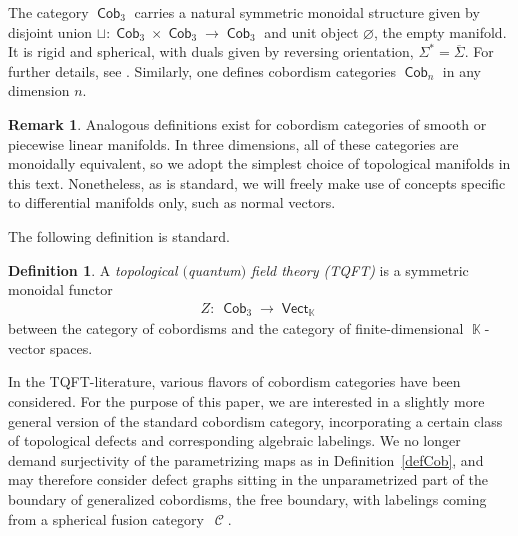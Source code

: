 \documentclass[10pt,a4paper]{amsart}
\DeclareMathOperator{\vect}{\mathsf{Vect}}
\DeclareMathOperator{\K}{\mathbb{K}}
\DeclareMathOperator{\Cob}{\mathsf{Cob}}
\DeclareMathOperator{\calc}{\mathcal{C}}
\numberwithin{equation}{section}
\theoremstyle{definition}
\newtheorem{Definition}[Definition]{Definition}
\newtheorem{Remark}[Remark]{Remark}
\begin{document}
The category $\Cob_3$ carries a natural symmetric monoidal structure given by disjoint union $\sqcup\colon \Cob_3 \times \Cob_3 \rightarrow \Cob_3$ and unit object $\varnothing$, the empty manifold. It is rigid and spherical, with duals given by reversing orientation, $\Sigma^* = \overline{\Sigma}$. For further details, see \cite[Section 10.1]{TV}. Similarly, one defines cobordism categories $\Cob_n$ in any dimension $n$.
\begin{Remark}
 \label{remTopPL}
 Analogous definitions exist for cobordism categories of smooth or piecewise linear manifolds. In three dimensions, all of these categories are monoidally equivalent, so we adopt the simplest choice of topological manifolds in this text. Nonetheless, as is standard, we will freely make use of concepts specific to differential manifolds only, such as normal vectors.
\end{Remark}
The following definition is standard.
\begin{Definition}
 \label{defTQFT}
 A \textit{topological $($quantum$)$ field theory (TQFT)} is a symmetric monoidal functor
 \begin{align*}
 Z\colon \ \Cob_3 \rightarrow \vect_{\K}
 \end{align*}
 between the category of cobordisms and the category of finite-dimensional $\K$-vector spaces.
\end{Definition}
In the TQFT-literature, various flavors of cobordism categories have been considered. For the purpose of this paper, we are interested in a slightly more general version of the standard cobordism category, incorporating a certain class of topological defects and corresponding algebraic labelings. We no longer demand surjectivity of the parametrizing maps as in Definition~\ref{defCob}, and may therefore consider defect graphs sitting in the unparametrized part of the boundary of generalized cobordisms, the free boundary, with labelings coming from a spherical fusion category~$\calc$.
\end{document}
